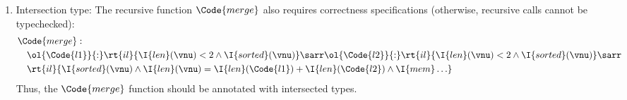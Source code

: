 \begin{enumerate}
    \begin{align*}
        &\Code{merge}:
        \\&\quad \ol{\Code{l1}}{:}\rt{il}{\I{len}(\vnu) \geq 2 \land \I{sorted}(\vnu)} \sarr \ul{\Code{l2}}{:}\rt{il}{\I{len}(\vnu) = 2 \land \I{sorted}(\vnu)} \sarr \rt{il}{\neg \I{sorted}(\vnu)}
        \\&\quad \ol{\Code{l1}}{:}\rt{il}{\I{len}(\vnu) \geq 2 \land \I{sorted}(\vnu)} \sarr \ul{\Code{l2}}{:}\unionty_{i{:}\Int}\rt{il}{\I{len}(\vnu) = i \land i \geq 2 \land \I{sorted}(\vnu)} \sarr \rt{il}{\neg \I{sorted}(\vnu)}
    \end{align*}\noindent
    This can lead to a more general specification of the $\Code{split}$ function (i.e., the incorrectness precondition):
    \begin{align*}
        &\Code{split}:
        \\&\quad \ul{l}{:}\rt{il}{\I{len}(\vnu) \geq 4} \sarr
        \\&\quad \ol{\Code{l1}}{:}\rt{il}{\I{len}(\vnu) \geq 2} \times \urt{il}{\I{len}(\vnu) = 2}
    \end{align*}\noindent
    This type can fit both implementations of the $\Code{split}$ function shown in Figure \ref{fig:split}.
    \item Intersection type: The recursive function $\Code{merge}$ also requires correctness specifications (otherwise, recursive calls cannot be typechecked):
    \begin{align*}
        &\Code{merge}:
        \\&\quad \ol{\Code{l1}}{:}\rt{il}{\I{len}(\vnu) < 2 \land \I{sorted}(\vnu)} \sarr \ol{\Code{l2}}{:}\rt{il}{\I{len}(\vnu) < 2 \land \I{sorted}(\vnu)} \sarr 
        \\&\quad \rt{il}{\I{sorted}(\vnu) \land \I{len}(\vnu) = \I{len}(\Code{l1}) + \I{len}(\Code{l2}) \land \I{mem}\ldots}
    \end{align*}\noindent
    Thus, the $\Code{merge}$ function should be annotated with intersected types.
\end{enumerate}